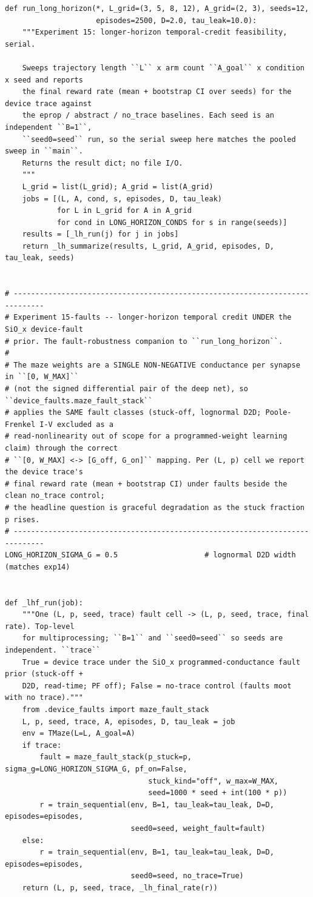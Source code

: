 \begin{lstlisting}[caption={mrl\_trace/maze.py},label={lst:siox-src-maze}]
def run_long_horizon(*, L_grid=(3, 5, 8, 12), A_grid=(2, 3), seeds=12,
                     episodes=2500, D=2.0, tau_leak=10.0):
    """Experiment 15: longer-horizon temporal-credit feasibility, serial.

    Sweeps trajectory length ``L`` x arm count ``A_goal`` x condition x seed and reports
    the final reward rate (mean + bootstrap CI over seeds) for the device trace against
    the eprop / abstract / no_trace baselines. Each seed is an independent ``B=1``,
    ``seed0=seed`` run, so the serial sweep here matches the pooled sweep in ``main``.
    Returns the result dict; no file I/O.
    """
    L_grid = list(L_grid); A_grid = list(A_grid)
    jobs = [(L, A, cond, s, episodes, D, tau_leak)
            for L in L_grid for A in A_grid
            for cond in LONG_HORIZON_CONDS for s in range(seeds)]
    results = [_lh_run(j) for j in jobs]
    return _lh_summarize(results, L_grid, A_grid, episodes, D, tau_leak, seeds)


# -----------------------------------------------------------------------------
# Experiment 15-faults -- longer-horizon temporal credit UNDER the SiO_x device-fault
# prior. The fault-robustness companion to ``run_long_horizon``.
#
# The maze weights are a SINGLE NON-NEGATIVE conductance per synapse in ``[0, W_MAX]``
# (not the signed differential pair of the deep net), so ``device_faults.maze_fault_stack``
# applies the SAME fault classes (stuck-off, lognormal D2D; Poole-Frenkel I-V excluded as a
# read-nonlinearity out of scope for a programmed-weight learning claim) through the correct
# ``[0, W_MAX] <-> [G_off, G_on]`` mapping. Per (L, p) cell we report the device trace's
# final reward rate (mean + bootstrap CI) under faults beside the clean no_trace control;
# the headline question is graceful degradation as the stuck fraction p rises.
# -----------------------------------------------------------------------------
LONG_HORIZON_SIGMA_G = 0.5                    # lognormal D2D width (matches exp14)


def _lhf_run(job):
    """One (L, p, seed, trace) fault cell -> (L, p, seed, trace, final rate). Top-level
    for multiprocessing; ``B=1`` and ``seed0=seed`` so seeds are independent. ``trace``
    True = device trace under the SiO_x programmed-conductance fault prior (stuck-off +
    D2D, read-time; PF off); False = no-trace control (faults moot with no trace)."""
    from .device_faults import maze_fault_stack
    L, p, seed, trace, A, episodes, D, tau_leak = job
    env = TMaze(L=L, A_goal=A)
    if trace:
        fault = maze_fault_stack(p_stuck=p, sigma_g=LONG_HORIZON_SIGMA_G, pf_on=False,
                                 stuck_kind="off", w_max=W_MAX,
                                 seed=1000 * seed + int(100 * p))
        r = train_sequential(env, B=1, tau_leak=tau_leak, D=D, episodes=episodes,
                             seed0=seed, weight_fault=fault)
    else:
        r = train_sequential(env, B=1, tau_leak=tau_leak, D=D, episodes=episodes,
                             seed0=seed, no_trace=True)
    return (L, p, seed, trace, _lh_final_rate(r))



\end{lstlisting}
